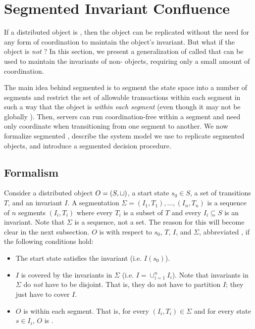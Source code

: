 \section{Segmented Invariant Confluence}
\newcommand{\IsIclosed}{\textsc{IsIclosed}}

If a distributed object is \invariantconfluent{}, then the object can be
replicated without the need for any form of coordination to maintain the
object's invariant. But what if the object is \emph{not} \invariantconfluent{}?
In this section, we present a generalization of \invariantconfluence{} called
 that can be used to maintain the
invariants of non-\invariantconfluent{} objects, requiring only a small amount
of coordination.

The main idea behind segmented \invariantconfluence{} is to segment the state
space into a number of segments and restrict the set of allowable transactions
within each segment in such a way that the object is \invariantconfluent{}
\emph{within each segment} (even though it may not be globally
\invariantconfluent{}). Then, servers can run coordination-free within a
segment and need only coordinate when transitioning from one segment to
another. We now formalize segmented \invariantconfluence{}, describe the system
model we use to replicate segmented \invariantconfluent{} objects, and
introduce a segmented \invariantconfluence{} decision procedure.

\subsection{Formalism}
Consider a distributed object $O = (S, \sqcup)$, a start state $s_0 \in S$, a
set of transitions $T$, and an invariant $I$. A segmentation $\Sigma = (I_1,
T_1), \ldots, (I_n, T_n)$ is a sequence of $n$ segments $(I_i, T_i)$ where
every $T_i$ is a subset of $T$ and every $I_i \subseteq S$ is an invariant.
Note that $\Sigma$ is a sequence, not a set. The reason for this will become
clear in the next subsection. $O$ is 
with respect to $s_0$, $T$, $I$, and $\Sigma$, abbreviated
, if the following conditions hold:
\begin{itemize}
  \item
    The start state satisfies the invariant (i.e. $I(s_0)$).

  \item
    $I$ is covered by the invariants in $\Sigma$ (i.e. $I = \cup_{i=1}^n I_i$).
    Note that invariants in $\Sigma$ do \emph{not} have to be disjoint. That
    is, they do not have to partition $I$; they just have to cover $I$.

  \item
    $O$ is \invariantconfluent{} within each segment. That is, for every $(I_i,
    T_i) \in \Sigma$ and for every state $s \in I_i$, $O$ is
    .
\end{itemize}

